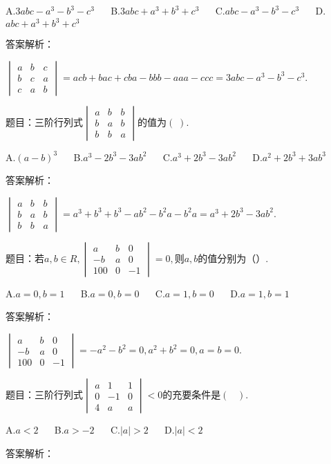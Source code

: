 A.$3abc-a^3-b^3-c^3$ $\quad$ B.$3abc+a^3+b^3+c^3$ $\quad$ C.$abc-a^3-b^3-c^3$ $\quad$ D.$abc+a^3+b^3+c^3$

答案解析：

$\begin{vmatrix}a&b&c\\b&c&a\\c&a&b\end{vmatrix}=acb+bac+cba-bbb-aaa-ccc=3abc-a^3-b^3-c^3.$



题目：$\mathrm{三阶行列式}\begin{vmatrix}a&b&b\\b&a&b\\b&b&a\end{vmatrix}\mathrm{的值为}(\;).$

A.$(a-b)^3$ $\quad$ B.$a^3-2b^3-3ab^2$ $\quad$ C.$a^3+2b^3-3ab^2$ $\quad$ D.$a^2+2b^3+3ab^3$

答案解析：

$\begin{vmatrix}a&b&b\\b&a&b\\b&b&a\end{vmatrix}=a^3+b^3+b^3-ab^2-b^2a-b^2a=a^3+2b^3-3ab^2.$



题目：$若a,b\in R,\begin{vmatrix}a&b&0\\-b&a&0\\100&0&-1\end{vmatrix}=0,则a,b\mathrm{的值分别为}（）.$

A.$a=0,b=1$ $\quad$ B.$a=0,b=0$ $\quad$ C.$a=1,b=0$ $\quad$ D.$a=1,b=1$

答案解析：

$\begin{vmatrix}a&b&0\\-b&a&0\\100&0&-1\end{vmatrix}=-a^2-b^2=0,a^2+b^2=0,a=b=0.$



题目：$\mathrm{三阶行列式}\begin{vmatrix}a&1&1\\0&-1&0\\4&a&a\end{vmatrix}<0\mathrm{的充要条件是}(\;\;\;).$

A.$a<2$ $\quad$ B.$a>-2$ $\quad$ C.$\left|a\right|>2$ $\quad$ D.$\left|a\right|<2$

答案解析：

